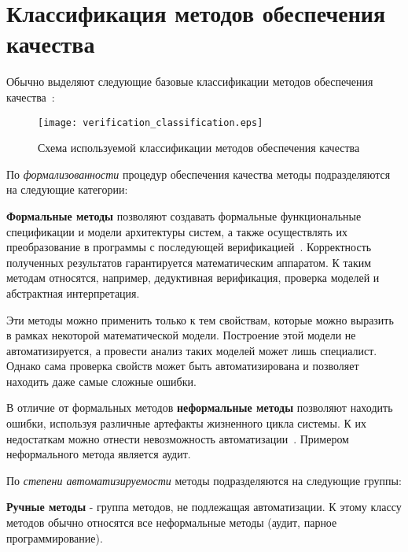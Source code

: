 \section{Классификация методов обеспечения качества}

Обычно выделяют следующие базовые классификации методов обеспечения
качества~\cite{itsykson}:

\newpage
\begin{figure}[ht]
    \begin{center}
        \texttt{[image: verification\_classification.eps]}
    \end{center}
    \caption{Схема используемой классификации методов обеспечения качества}
    \label{fig:verification_classification}
\end{figure}

По \emph{формализованности} процедур обеспечения качества методы
подразделяются на следующие категории:

\textbf{Формальные методы} позволяют создавать формальные функциональные
спецификации и модели архитектуры систем, а также осуществлять их преобразование
в программы с последующей верификацией~\cite{formal_methods}. Корректность
полученных результатов гарантируется математическим аппаратом. К таким методам
относятся, например, дедуктивная верификация, проверка моделей и абстрактная
интерпретация.

Эти методы можно применить только к тем свойствам, которые можно выразить в
рамках некоторой математической модели. Построение этой модели не
автоматизируется, а провести анализ таких моделей может лишь специалист. Однако
сама проверка свойств может быть автоматизирована и позволяет находить даже
самые сложные ошибки.

В отличие от формальных методов \textbf{неформальные методы} позволяют находить
ошибки, используя различные артефакты жизненного цикла системы. К их недостаткам
можно отнести невозможность автоматизации~\cite{kulyamin}. Примером
неформального метода является аудит.

По \emph{степени автоматизируемости} методы подразделяются на следующие
группы:

\textbf{Ручные методы} - группа методов, не подлежащая автоматизации. К этому
классу методов обычно относятся все неформальные методы (аудит, парное
программирование).

